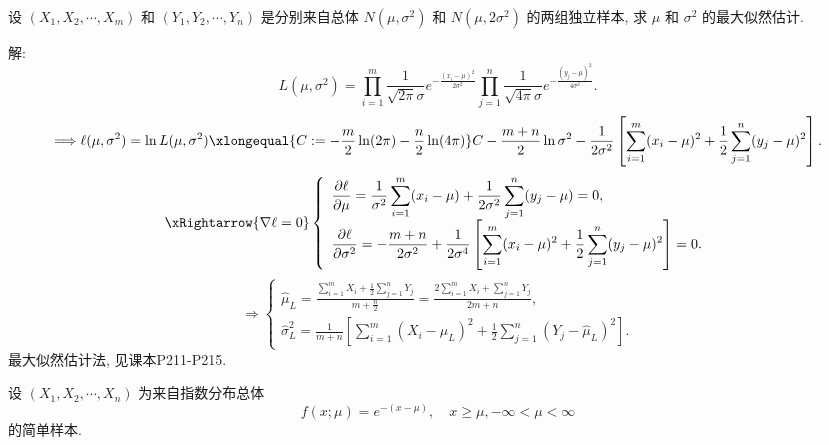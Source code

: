 \documentclass[standard]{ExBook}
\renewenvironment{shaded}{%
  \def\FrameCommand{\fboxsep=\FrameSep \colorbox{shadecolor}}%
  \MakeFramed{\advance\hsize-\width \FrameRestore}%
}{%
  \endMakeFramed
}
\begin{document}
\begin{qitems}
\vspace{2.5cm-5em}

    \begin{bbox}
    \begin{shaded}
        \qitem
设 \((X_1, X_2, \cdots, X_m)\) 和 \((Y_1, Y_2, \cdots, Y_n)\) 是分别来自总体 \(N(\mu, \sigma^2)\) 和 \(N(\mu, 2\sigma^2)\) 的两组独立样本, 求 \(\mu\) 和 \(\sigma^2\) 的最大似然估计.
    \end{shaded}
    \end{bbox}

\vspace{\dimexpr2.5cm-5em\relax}

解:
$$
L(\mu,\sigma^2)
=
\prod_{i=1}^{m}\frac{1}{\sqrt{2\pi}\sigma}
e^{-\frac{(x_i-\mu)^2}{2\sigma^2}}
\prod_{j=1}^{n}\frac{1}{\sqrt{4\pi}\sigma}
e^{-\frac{(y_j-\mu)^2}{4\sigma^2}}.
$$
$$
\Longrightarrow
\ell(\mu,\sigma^2)
=\ln L(\mu,\sigma^2)
\xlongequal{C:=-\frac{m}{2}\ln(2\pi)-\frac{n}{2}\ln(4\pi)}
C-\frac{m+n}{2}\ln\sigma^2
-\frac{1}{2\sigma^2}
\left[
\sum_{i=1}^{m}(x_i-\mu)^2
+\frac{1}{2}\sum_{j=1}^{n}(y_j-\mu)^2
\right].
$$
$$
\xRightarrow{\nabla\ell=0}
\left\{
\begin{array}{l}
\displaystyle
\frac{\partial\ell}{\partial\mu}
=
\frac{1}{\sigma^2}\sum\limits_{i=1}^{m}(x_i-\mu)
+\frac{1}{2\sigma^2}\sum\limits_{j=1}^{n}(y_j-\mu)
=0,\\
\displaystyle
\frac{\partial\ell}{\partial\sigma^2}
=
-\frac{m+n}{2\sigma^2}
+\frac{1}{2\sigma^4}
\left[
\sum\limits_{i=1}^{m}(x_i-\mu)^2
+\frac{1}{2}\sum\limits_{j=1}^{n}(y_j-\mu)^2
\right]
=0.
\end{array}
\right.
$$
$$
\Longrightarrow
\left\{
\begin{array}{l}
\hat{\mu}_{L}
=
\displaystyle
\frac{\sum\limits_{i=1}^{m}X_i+\frac{1}{2}\sum\limits_{j=1}^{n}Y_j}{m+\frac{n}{2}}
=
\frac{2\sum\limits_{i=1}^{m}X_i+\sum\limits_{j=1}^{n}Y_j}{2m+n},\\
\hat{\sigma}_{L}^{2}
=
\displaystyle
\frac{1}{m+n}
\left[
\sum\limits_{i=1}^{m}(X_i-\hat{\mu}_{L})^2
+\frac{1}{2}\sum\limits_{j=1}^{n}(Y_j-\hat{\mu}_{L})^2
\right].
\end{array}
\right.
$$
\textcolor{themeColor}{\selectfont {} 最大似然估计法, 见课本P211-P215.}

\vspace{2.5cm-5em}

    \begin{bbox}
    \begin{shaded}
        \qitem
设 \((X_1, X_2, \cdots, X_n)\) 为来自指数分布总体
$$
f(x; \mu) = e^{-(x - \mu)}, \quad x \geq \mu, -\infty < \mu < \infty
$$
的简单样本.  


\end{shaded}
\end{bbox}
\end{qitems}
\end{document}
